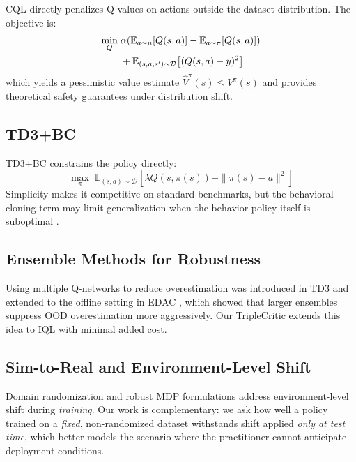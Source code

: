 \documentclass[conference]{IEEEtran}
\begin{document}
CQL \cite{kumar2020cql} directly penalizes Q-values on actions outside the
dataset distribution. The objective is:
\begin{align}
  \min_Q\; &\alpha\!\left(\mathbb{E}_{a\sim\mu}[Q(s,a)]
  - \mathbb{E}_{a\sim\pi}[Q(s,a)]\right) \notag \\
  &+ \mathbb{E}_{(s,a,s')\sim\mathcal{D}}\!\left[(Q(s,a)-y)^2\right]
  \label{eq:cql}
\end{align}
which yields a pessimistic value estimate $\hat{V}^\pi(s) \le V^\pi(s)$ and
provides theoretical safety guarantees under distribution shift.

\subsection{TD3+BC}

TD3+BC \cite{fujimoto2021td3bc} constrains the policy directly:
\begin{equation}
  \max_\pi\;
  \mathbb{E}_{(s,a)\sim\mathcal{D}}\!\left[\lambda Q(s,\pi(s))
  -\|\pi(s)-a\|^2\right]
  \label{eq:td3bc}
\end{equation}
Simplicity makes it competitive on standard benchmarks, but the behavioral
cloning term may limit generalization when the behavior policy itself is
suboptimal \cite{fujimoto2021td3bc}.

\subsection{Ensemble Methods for Robustness}

Using multiple Q-networks to reduce overestimation was introduced in TD3
\cite{fujimoto2018td3} and extended to the offline setting in EDAC
\cite{an2021edac}, which showed that larger ensembles suppress OOD
overestimation more aggressively. Our TripleCritic extends this idea to IQL
with minimal added cost.

\subsection{Sim-to-Real and Environment-Level Shift}

Domain randomization \cite{tobin2017domainrand} and robust MDP formulations
\cite{iyengar2005robustmdp} address environment-level shift during
\emph{training}. Our work is complementary: we ask how well a policy trained
on a \emph{fixed}, non-randomized dataset withstands shift applied \emph{only
at test time}, which better models the scenario where the practitioner cannot
anticipate deployment conditions.
\end{document}
